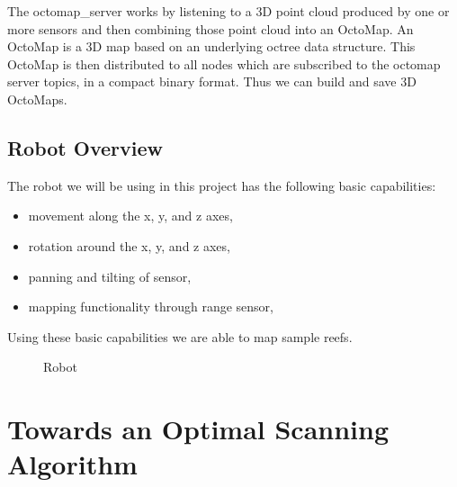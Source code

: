 \documentclass[twoside, 12pt]{article}
\begin{document}
The octomap\_server works by listening to a 3D point cloud produced by one or more sensors and then combining those point cloud into an OctoMap. An OctoMap is a 3D map based on an underlying octree data structure. This OctoMap is then distributed to all nodes which are subscribed to the octomap server topics, in a compact binary format. Thus we can build and save 3D OctoMaps.\\

\subsection{Robot Overview}

The robot we will be using in this project has the following basic capabilities:
\begin{itemize}
\item movement along the x, y, and z axes,
\item rotation around the x, y, and z axes,
\item panning and tilting of sensor,
\item mapping functionality through range sensor,
\end{itemize}

Using these basic capabilities we are able to map sample reefs.\\

\begin{figure}
\vspace{-26pt}
  \begin{center}
  \end{center}
\vspace{-20pt}
  \caption{Robot}
  \label{fig:robot}
\end{figure}

\begin{figure}
\vspace{-50pt}
\end{figure}

\newpage
\section{Towards an Optimal Scanning Algorithm}
\label{sec:optimalScanningAlgorithm}
\end{document}
